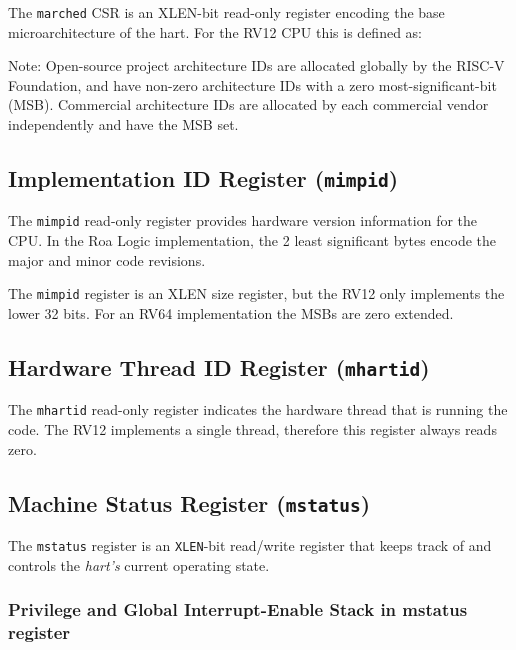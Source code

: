 The \texttt{marched} CSR is an XLEN-bit read-only register encoding the base
microarchitecture of the hart. For the RV12 CPU this is defined as:



Note: Open-source project architecture IDs are allocated globally by the
RISC-V Foundation, and have non-zero architecture IDs with a zero
most-significant-bit (MSB). Commercial architecture IDs are allocated by
each commercial vendor independently and have the MSB set.

\subsection{Implementation ID Register
(\texttt{mimpid})}\label{implementation-id-register-mimpid}

The \texttt{mimpid} read-only register provides hardware version information for
the CPU. In the Roa Logic implementation, the 2 least significant bytes
encode the major and minor code revisions.



The \texttt{mimpid} register is an XLEN size register, but the RV12 only
implements the lower 32 bits. For an RV64 implementation the MSBs are
zero extended.

\subsection{Hardware Thread ID Register
(\texttt{mhartid})}\label{hardware-thread-id-register-mhartid}



The \texttt{mhartid} read-only register indicates the hardware thread that is
running the code. The RV12 implements a single thread, therefore this
register always reads zero.

\subsection{Machine Status Register
(\texttt{mstatus})}\label{machine-status-register-mstatus}

The \texttt{mstatus} register is an \texttt{XLEN}-bit read/write register that keeps track
of and controls the \emph{hart's} current operating state.

\subsubsection{Privilege and Global Interrupt-Enable Stack in mstatus register}

